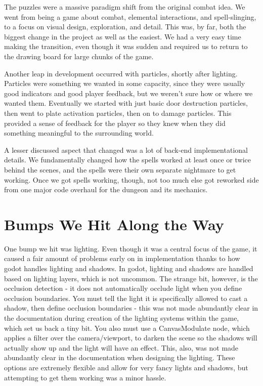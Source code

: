 \documentclass{sigchi}
\begin{document}
The puzzles were a massive paradigm shift from the original combat idea.  We went from being a game about combat, elemental interactions, and spell-slinging, to a focus on visual design, exploration, and detail.  This was, by far, both the biggest change in the project as well as the easiest.  We had a very easy time making the transition, even though it was sudden and required us to return to the drawing board for large chunks of the game.

Another leap in development occurred with particles, shortly after lighting.  Particles were something we wanted in some capacity, since they were usually good indicators and good player feedback, but we weren't sure how or where we wanted them.  Eventually we started with just basic door destruction particles, then went to plate activation particles, then on to damage particles.  This provided a sense of feedback for the player so they knew when they did something meaningful to the surrounding world.

A lesser discussed aspect that changed was a lot of back-end implementational details.  We fundamentally changed how the spells worked at least once or twice behind the scenes, and the spells were their own separate nightmare to get working.  Once we got spells working, though, not too much else got reworked side from one major code overhaul for the dungeon and its mechanics.
\section{Bumps We Hit Along the Way}
One bump we hit was lighting.  Even though it was a central focus of the game, it caused a fair amount of problems early on in implementation thanks to how godot handles lighting and shadows.  In godot, lighting and shadows are handled based on lighting layers, which is not uncommon.  The strange bit, however, is the occlusion detection - it does not automatically occlude light when you define occlusion boundaries.  You must tell the light it is specifically allowed to cast a shadow, then define occlusion boundaries - this was not made abundantly clear in the documentation during creation of the lighting systems within the game, which set us back a tiny bit.  You also must use a CanvasModulate node, which applies a filter over the camera/viewport, to darken the scene so the shadows will actually show up and the light will have an effect.  This, also, was not made abundantly clear in the documentation when designing the lighting.  These options are extremely flexible and allow for very fancy lights and shadows, but attempting to get them working was a minor hassle.




\end{document}
